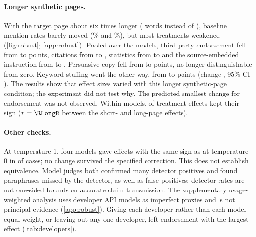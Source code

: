 \paragraph{Longer synthetic pages.} With the target page about six times
longer (\RLongWords{} words instead of \RLongWordsShort), baseline mention rates barely moved (\RLongBaseMain\% and
\RLongBaseAlt\%), but most treatments weakened (\cref{fig:robust}; \cref{app:robust}). Pooled over the \RLongNModels{}
models, third-party endorsement fell from \RLongMainThirdParty{} to \RLongAltThirdParty{} points, citations from
\RLongMainCitations{} to \RLongAltCitations, statistics from \RLongMainStatistics{} to \RLongAltStatistics{} and the
source-embedded instruction from \RLongMainInjection{} to \RLongAltInjection. Persuasive copy fell from \RLongMainPersuasive{} to
\RLongAltPersuasive{} points, no longer distinguishable from zero. Keyword stuffing went the other way, from
\RLongMainKeywordStuffing{} to \RLongAltKeywordStuffing{} points (change \RLongChangeKeywordStuffing, 95\% CI
\RLongChangeKeywordStuffingCI). The results show that effect sizes varied with this longer synthetic-page condition;
the experiment did not test why. The predicted smallest change for endorsement was not observed. Within models,
\RLongSame{} of \RLongPairs{} treatment effects kept their sign ($r = \RLongR$ between the short- and long-page effects).

\paragraph{Other checks.} At temperature 1, four models gave effects with the same sign as at temperature 0 in
\RTempSame{} of \RTempPairs{} cases; no change survived the specified correction. This does not establish equivalence.
Model judges both confirmed many detector positives and found paraphrases missed by the detector, as well as false
positives; detector rates are not one-sided bounds on accurate claim transmission. The supplementary usage-weighted
analysis uses developer API models as imperfect proxies and is not principal evidence (\cref{app:robust}). Giving each
developer rather than each model equal weight, or leaving out any one developer, left endorsement with the largest
effect (\cref{tab:developers}).

